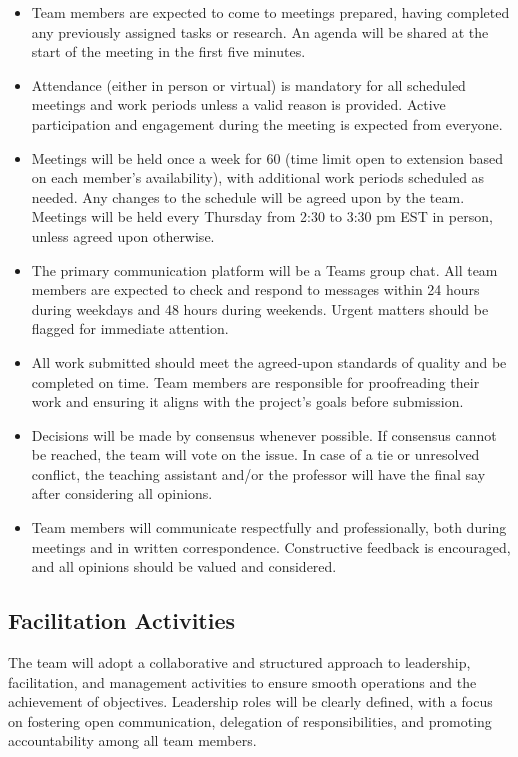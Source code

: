 \documentclass[titlepage]{article}
\begin{document}
\begin{itemize}
  \item Team members are expected to come to meetings prepared, having
    completed any previously assigned tasks or research. An agenda will
    be shared at the start of the
    meeting in the first five minutes.
  \item Attendance (either in person or virtual) is mandatory for all
    scheduled meetings and
    work periods unless a valid reason is provided. Active participation
    and engagement
    during the meeting is expected from everyone.
  \item Meetings will be held once a week for 60 (time limit open to extension based on each member's availability),
    with additional work periods scheduled as needed. Any changes to
    the schedule
    will be agreed upon by the team. Meetings will be held every Thursday
    from 2:30 to
    3:30 pm EST in person, unless agreed upon otherwise.
  \item The primary communication platform will be a Teams group chat. All team
    members are expected to check and respond to messages within 24
    hours during weekdays and 48 hours during weekends. Urgent
    matters should be flagged for immediate attention.
  \item All work submitted should meet the agreed-upon standards of
    quality and be
    completed on time. Team members are responsible for proofreading their
    work and ensuring it aligns with the project’s goals before submission.
  \item Decisions will be made by consensus whenever possible. If
    consensus cannot be
    reached, the team will vote on the issue. In case of a tie or
    unresolved conflict, the
    teaching assistant and/or the professor will have the final say after
    considering all opinions.
  \item Team members will communicate respectfully and
    professionally, both during
    meetings and in written correspondence. Constructive feedback is encouraged,
    and all opinions should be valued and considered.
\end{itemize}

\subsection{Facilitation Activities}
The team will adopt a collaborative and structured approach to
leadership, facilitation, and management activities to ensure smooth
operations and the achievement of objectives. Leadership roles will
be clearly defined, with a focus on fostering open communication,
delegation of responsibilities, and promoting accountability among
all team members.\\
\end{document}
